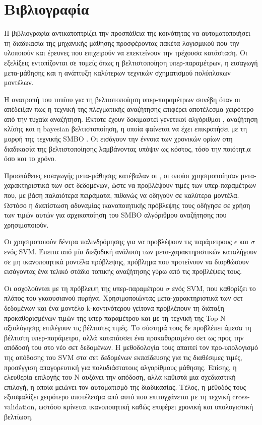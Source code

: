 \chapter{Βιβλιογραφία}
Η βιβλιογραφία αντικατοπτρίζει την προσπάθεια της κοινότητας να αυτοματοποιήσει τη διαδικασία της μηχανικής μάθησης προσφέροντας πακέτα λογισμικού που την υλοποιούν και έρευνες που επιχειρούν να επεκτείνουν την τρέχουσα κατάσταση. Οι εξελίξεις εντοπίζονται σε τομείς όπως η βελτιστοποίηση υπερ-παραμέτρων, η εισαγωγή μετα-μάθησης και η ανάπτυξη καλύτερων τεχνικών σχηματισμού πολύπλοκων μοντέλων.

Η ανατροπή του τοπίου για τη βελτιστοποίηση υπερ-παραμέτρων συνέβη όταν οι \citet{Bergstra:2012:RSH:2188385.2188395} απέδειξαν πως η τεχνική της πλεγματικής αναζήτησης επιφέρει αποτέλεσμα χειρότερο από την τυχαία αναζήτηση. Έκτοτε έχουν δοκιμαστεί γενετικοί αλγόριθμοι \citep{1554741}, αναζήτηση κλίσης \citep{wassenberg} και η bayesian βελτιστοποίηση, η οποία φαίνεται να έχει επικρατήσει με τη μορφή της τεχνικής SMBO \citep{DBLP:journals/corr/abs-1208-3719}. Οι \citet{HutHooLeyMur10} εισάγουν την έννοια των χρονικών ορίων στη διαδικασία της βελτιστοποίησης λαμβάνοντας υπόψιν ως κόστος, τόσο την ποιότητ,α όσο και το χρόνο.

Προσπάθειες εισαγωγής μετα-μάθησης κατέβαλαν οι \citet{Feurer:2014:UMI:3015544.3015549}, οι οποίοι χρησιμοποίησαν μετα-χαρακτηριστικά των σετ δεδομένων, ώστε να προβλέψουν τιμές των υπερ-παραμέτρων που, με βάση παλαιότερα πειράματα, πιθανώς να οδηγούν σε καλύτερα μοντέλα. Ωστόσο η διαπίστωση αδυναμίας ικανοποιητικής πρόβλεψης τους οδήγησε σε χρήση των τιμών αυτών για αρχικοποίηση του SMBO αλγόριθμου αναζήτησης που χρησιμοποιούν.  

Οι \citet{kuba2002exploiting} χρησιμοποιούν δέντρα παλινδρόμησης για να προβλέψουν τις παράμετρους $\epsilon$ και $\sigma$ ενός \gls{SVM}. Έπειτα από μία διεξοδική ανάλυση των μετα-χαρακτηριστικών καταλήγουν σε μη ικανοποιητικά μοντέλα πρόβλεψης, πρόβλημα που προτείνουν να διορθώσουν εισάγοντας ένα τελικό στάδιο τοπικής αναζήτησης γύρω από τις προβλέψεις τους.


Οι \citet{Soares2004} ασχολούνται με τη πρόβλεψη της υπερ-παραμέτρου $\sigma$ ενός SVM, που καθορίζει το πλάτος του γκαουσιανού πυρήνα. Χρησιμοποιώντας μετα-χαρακτηριστι\-κά των σετ δεδομένων και ένα μοντέλο k-κοντινότερου γείτονα προβλέπουν τη διάταξη προκαθορισμένων τιμών της υπερ-παραμέτρου και με τη τεχνική της Top-Ν αξιολόγησης επιλέγουν τις βέλτιστες τιμές. Το σύστημά τους δε προβλέπει άμεσα τη βέλτιστη υπερ-παράμετρο, αλλά κατατάσσει ένα προκαθορισμένο σετ ως προς την απόδοσή του στο νέο σετ δεδομένων. Η μεθοδολογία τους απαιτεί τον προ-υπολογισμό της απόδοσης του SVM στα σετ δεδομένων εκπαίδευσης για τις διαθέσιμες τιμές, προσέγγιση απαγορευτική για πολυδιάστατους αλγορίθμους μάθησης. Επίσης, η ελευθερία επιλογής του Ν αυξάνει την απόδοση, αλλά καθιστά μια σχεδιαστική επιλογή, η οποία μειώνει τον αυτοματισμό της διαδικασίας. Τέλος, η μέθοδός τους εξασφαλίζει χειρότερο αποτέλεσμα από αυτό που επιτυγχάνεται με τη τεχνική cross-validation, ωστόσο κρίνεται ικανοποιητική καθώς επιφέρει χρονική και υπολογιστική βελτίωση. 

